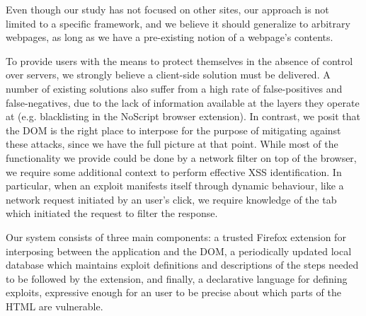  Even though our study has not focused on other sites, our approach is not limited to a specific framework, and we believe it should generalize to arbitrary webpages, as long as we have a pre-existing notion of a webpage's contents.

To provide users with the means to protect themselves in the absence of control over servers, we strongly believe a client-side solution must be delivered. A number of existing solutions also suffer from a high rate of false-positives and false-negatives, due to the lack of information available at the layers they operate at (e.g. blacklisting in the NoScript browser extension). In contrast, we posit that the DOM is the right place to interpose for the purpose of mitigating against these attacks, since we have the full picture at that point. While most of the functionality we provide could be done by a network filter on top of the browser, we require some additional context to perform effective XSS identification. In particular, when an exploit manifests itself through dynamic behaviour, like a network request initiated by an user's click, we require knowledge of the tab which initiated the request to filter the response.

 Our system consists of three main components: a trusted Firefox extension for interposing between the application and the DOM, a periodically updated local database which maintains exploit definitions and descriptions of the steps needed to be followed by the extension, and finally, a declarative language for defining exploits, expressive enough for an user to be precise about which parts of the HTML are vulnerable. 


